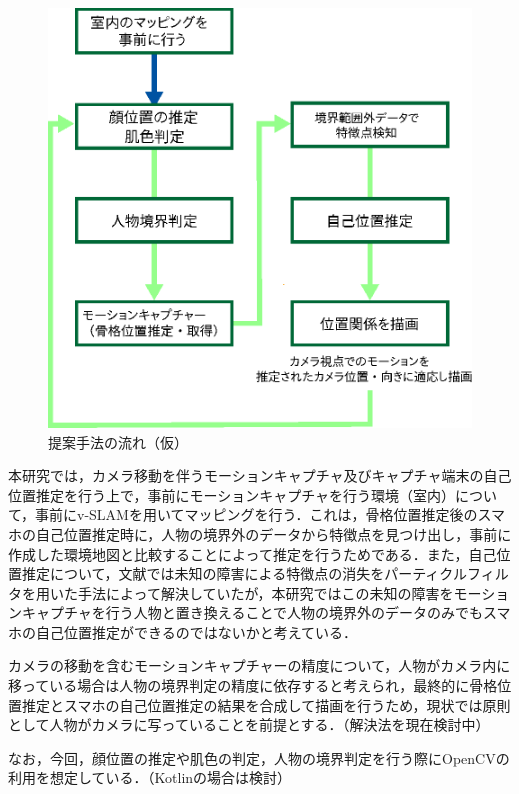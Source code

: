 \documentclass[11pt]{jreport}
\begin{document}
\vspace{20pt}
\begin{figure}[htbp]
  \centering
  \includegraphics[scale = 0.8]{fig/memo2.eps}
  \caption{提案手法の流れ（仮）}
  \label{method-fig}
\end{figure}

本研究では，カメラ移動を伴うモーションキャプチャ及びキャプチャ端末の自己位置推定を行う上で，事前にモーションキャプチャを行う環境（室内）について，事前にv-SLAMを用いてマッピングを行う．これは，骨格位置推定後のスマホの自己位置推定時に，人物の境界外のデータから特徴点を見つけ出し，事前に作成した環境地図と比較することによって推定を行うためである．また，自己位置推定について，文献\cite{the-3}では未知の障害による特徴点の消失をパーティクルフィルタを用いた手法によって解決していたが，本研究ではこの未知の障害をモーションキャプチャを行う人物と置き換えることで人物の境界外のデータのみでもスマホの自己位置推定ができるのではないかと考えている．

カメラの移動を含むモーションキャプチャーの精度について，人物がカメラ内に移っている場合は人物の境界判定の精度に依存すると考えられ，最終的に骨格位置推定とスマホの自己位置推定の結果を合成して描画を行うため，現状では原則として人物がカメラに写っていることを前提とする．（解決法を現在検討中）

なお，今回，顔位置の推定や肌色の判定，人物の境界判定を行う際にOpenCVの利用を想定している．（Kotlinの場合は検討）
\end{document}
